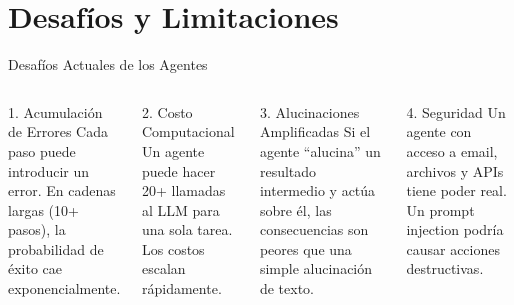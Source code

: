 \documentclass[aspectratio=169]{beamer}
\begin{document}
\section{Desafíos y Limitaciones}
\begin{frame}{Desafíos Actuales de los Agentes}
    \begin{columns}[t]
        \begin{alertblock}{1. Acumulación de Errores}
            Cada paso puede introducir un error. En cadenas largas (10+ pasos), la probabilidad de éxito cae exponencialmente.
        \end{alertblock}
        
        \begin{alertblock}{2. Costo Computacional}
            Un agente puede hacer 20+ llamadas al LLM para una sola tarea. Los costos escalan rápidamente.
        \end{alertblock}
        
        \begin{alertblock}{3. Alucinaciones Amplificadas}
            Si el agente ``alucina'' un resultado intermedio y actúa sobre él, las consecuencias son peores que una simple alucinación de texto.
        \end{alertblock}
        
        \begin{alertblock}{4. Seguridad}
            Un agente con acceso a email, archivos y APIs tiene poder real. Un prompt injection podría causar acciones destructivas.
        \end{alertblock}
    \end{columns}
\end{frame}
\end{document}
